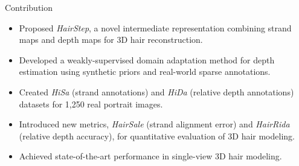 
\begin{frame}[t]{Contribution}
    \begin{itemize}
        \item Proposed \textit{HairStep}, a novel intermediate representation combining strand maps and depth maps for 3D hair reconstruction.
        \item Developed a weakly-supervised domain adaptation method for depth estimation using synthetic priors and real-world sparse annotations.
        \item Created \textit{HiSa} (strand annotations) and \textit{HiDa} (relative depth annotations) datasets for 1,250 real portrait images.
        \item Introduced new metrics, \textit{HairSale} (strand alignment error) and \textit{HairRida} (relative depth accuracy), for quantitative evaluation of 3D hair modeling.
        \item Achieved state-of-the-art performance in single-view 3D hair modeling.
    \end{itemize}
\end{frame}